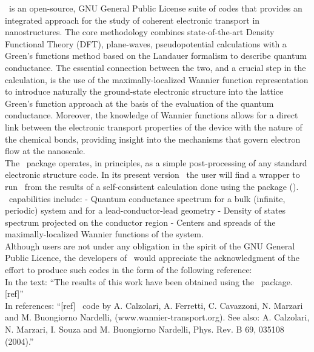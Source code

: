  \WANT\ is an open-source, GNU
General Public License suite of codes that provides an integrated
approach for the study of coherent electronic transport in
nanostructures. The core methodology combines state-of-the-art
Density Functional Theory (DFT), plane-waves, pseudopotential
calculations with a Green's functions method based on the Landauer
formalism to describe quantum conductance. The essential
connection between the two, and a crucial step in the calculation,
is the use of the maximally-localized Wannier function
representation to introduce naturally the ground-state electronic
structure into the lattice Green's function approach at the basis
of the evaluation of the quantum conductance. Moreover, the
knowledge of Wannier functions allows for a
direct link between the electronic transport properties of the
device with the nature of the chemical bonds, providing insight
into the mechanisms that govern electron flow at the nanoscale.\\

\noindent The \WANT\ package operates, in principles, as a simple
post-processing of any standard electronic structure code. In its
present version \WANTVERSION\ the user will find a wrapper to run
\WANT\ from the results of a self-consistent calculation done
using the \PWSCF package (\PWSCFURL).\\

\noindent \WANT\ capabilities include:
- Quantum conductance spectrum for a bulk (infinite, periodic)
system and for a lead-conductor-lead geometry - Density of states
spectrum projected on the conductor region - Centers and spreads of the
maximally-localized Wannier functions of the system.\\

\newpage
{} Although users are not under any
obligation in the spirit of the GNU General Public Licence, the
developers of \WANT\ would appreciate the acknowledgment of the
effort to produce such codes in the form of the following
reference:\\

\noindent In the text: ``The results of this work have been
obtained using the \WANT\ package.[ref]''\\

\noindent In references: ``[ref] \WANT\ code by A. Calzolari, A.
Ferretti, C. Cavazzoni, N. Marzari and M. Buongiorno Nardelli,
(www.wannier-transport.org). See also: A. Calzolari, N. Marzari,
I. Souza and M. Buongiorno Nardelli, Phys. Rev. B 69, 035108
(2004).''\\
  \vspace{0.25in}

